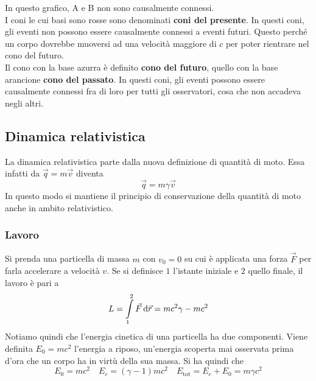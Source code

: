 \begin{center}
\end{center}
In questo grafico, A e B non sono causalmente connessi.\\
I coni le cui basi sono rosse sono denominati \textbf{coni del presente}. In questi coni, gli 
eventi non possono essere causalmente connessi a eventi futuri. Questo perché un corpo
dovrebbe muoversi ad una velocità maggiore di $c$ per poter rientrare nel cono del futuro.\\
Il cono con la base azurra è definito \textbf{cono del futuro}, quello con la base arancione
\textbf{cono del passato}. In questi coni, gli eventi possono essere causalmente connessi fra di 
loro per tutti gli osservatori, cosa che non accadeva negli altri.

\subsection{Dinamica relativistica}
La dinamica relativistica parte dalla nuova definizione di quantità di moto. Essa infatti da
$\vec{q}=m\vec{v}$ diventa
\begin{equation*}
  \vec{q} = m\gamma\vec{v}
\end{equation*}
In questo modo si mantiene il principio di conservazione della quantità di moto anche in ambito
relativistico.
\subsubsection{Lavoro}
Si prenda una particella di massa $m$ con $v_0=0$ su cui è applicata una forza $\vec{F}$ per farla
accelerare a velocità $v$. Se si definisce $1$ l'istante iniziale e $2$ quello finale,
il lavoro è pari a
\begin{equation*}
  L = \int\limits_{1}^{2} \vec{F}\mathop{}\!\mathrm{d}\vec{r}=
  mc^2\gamma-mc^2
\end{equation*}
Notiamo quindi che l'energia cinetica di una particella ha due componenti. Viene definita
$E_0=mc^2$ l'energia a riposo, un'energia scoperta mai osservata prima d'ora che un corpo ha in 
virtù della sua massa. Si ha quindi che
\begin{equation*}
  E_0=mc^2\quad E_c=(\gamma-1)mc^2\quad E_{\text{tot}}=E_c+E_0=m\gamma c^2
\end{equation*}
